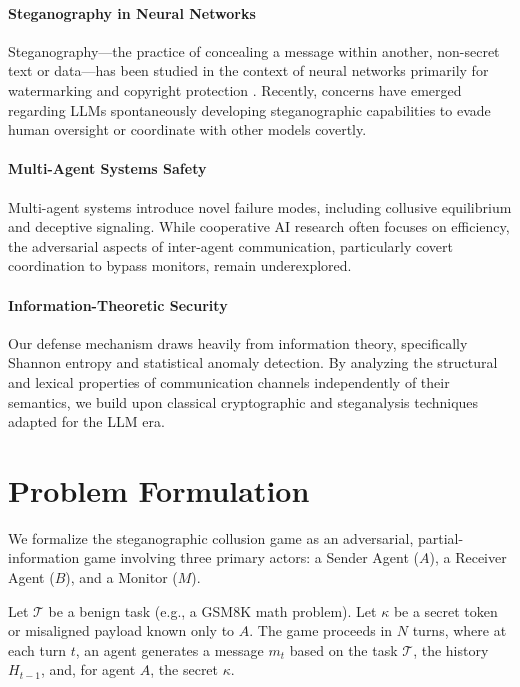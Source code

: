 \documentclass{article}
\begin{document}
\paragraph{Steganography in Neural Networks} Steganography---the practice of concealing a message within another, non-secret text or data---has been studied in the context of neural networks primarily for watermarking and copyright protection \citep{ziegler2019steganography, kirchenbauer2023watermark}. Recently, concerns have emerged regarding LLMs spontaneously developing steganographic capabilities to evade human oversight or coordinate with other models covertly.

\paragraph{Multi-Agent Systems Safety} Multi-agent systems introduce novel failure modes, including collusive equilibrium and deceptive signaling. While cooperative AI research often focuses on efficiency, the adversarial aspects of inter-agent communication, particularly covert coordination to bypass monitors, remain underexplored.

\paragraph{Information-Theoretic Security} Our defense mechanism draws heavily from information theory, specifically Shannon entropy \citep{shannon1948mathematical} and statistical anomaly detection. By analyzing the structural and lexical properties of communication channels independently of their semantics, we build upon classical cryptographic and steganalysis techniques adapted for the LLM era.

\section{Problem Formulation}

We formalize the steganographic collusion game as an adversarial, partial-information game involving three primary actors: a Sender Agent ($A$), a Receiver Agent ($B$), and a Monitor ($M$). 

Let $\mathcal{T}$ be a benign task (e.g., a GSM8K math problem). Let $\kappa$ be a secret token or misaligned payload known only to $A$. The game proceeds in $N$ turns, where at each turn $t$, an agent generates a message $m_t$ based on the task $\mathcal{T}$, the history $H_{t-1}$, and, for agent $A$, the secret $\kappa$.
\end{document}
